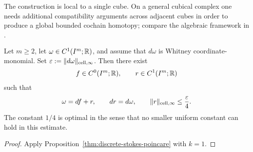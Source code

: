 \begin{remark}
The construction is local to a single cube. On a general cubical complex one
needs additional compatibility arguments across adjacent cubes in order to
produce a global bounded cochain homotopy; compare the algebraic framework in
\cite{Dupont1976,DupontBook1978,Albert2020}.
\end{remark}



\begin{corollary}
\label{cor:hypercube-gradient}
Let $m\ge 2$, let $\omega\in C^1(I^m;\mathbb{R})$, and assume that $d\omega$ is Whitney
coordinate-monomial. Set $\varepsilon:=\lVert d\omega \rVert_{\mathrm{cell},\infty}$. Then
there exist
\[
f\in C^0(I^m;\mathbb{R}),
\qquad
r\in C^1(I^m;\mathbb{R})
\]
such that
\[
\omega=df+r,
\qquad
dr=d\omega,
\qquad
\lVert r \rVert_{\mathrm{cell},\infty}\le \frac{\varepsilon}{4}.
\]
The constant $1/4$ is optimal in the sense that no smaller uniform constant can
hold in this estimate.
\end{corollary}

\begin{proof}
Apply Proposition~\ref{thm:discrete-stokes-poincare} with $k=1$.
\end{proof}

\appendix
